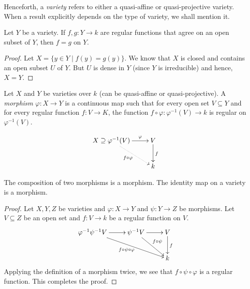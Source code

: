 Henceforth, a \emph{variety} refers to either a quasi-affine or quasi-projective variety. When a result explicitly depends on the type of variety, we shall mention it.

\begin{corollary}
    Let $Y$ be a variety. If $f,g: Y\to k$ are regular functions that agree on an open subset of $Y$, then $f = g$ on $Y$.
\end{corollary}
\begin{proof}
    Let $X = \{y\in Y\mid f(y) = g(y)\}$. We know that $X$ is closed and contains an open subset $U$ of $Y$. But $U$ is dense in $Y$ (since $Y$ is irreducible) and hence, $X = Y$.
\end{proof}

\begin{definition}[Morphism]
    Let $X$ and $Y$ be varieties over $k$ (can be quasi-affine or quasi-projective). A \emph{morphism} $\varphi: X\to Y$ is a continuous map such that for every open set $V\subseteq Y$ and for every regular function $f: V\to K$, the function $f\circ\varphi:\varphi^{-1}(V)\to k$ is regular on $\varphi^{-1}(V)$.

    \begin{equation*}
        \xymatrix {
            X\supseteq\varphi^{-1}(V)\ar[r]^-{\varphi}\ar@{.>}[rd]_{f\circ\varphi} & V\ar[d]^{f}\\
            & k
        }
    \end{equation*}
\end{definition}

\begin{proposition}
    The composition of two morphisms is a morphism. The identity map on a variety is a morphism.
\end{proposition}
\begin{proof}
    Let $X, Y, Z$ be varieties and $\varphi: X\to Y$ and $\psi: Y\to Z$ be morphisms. Let $V\subseteq Z$ be an open set and $f: V\to k$ be a regular function on $V$.
    \begin{equation*}
        \xymatrix {
            \varphi^{-1}\psi^{-1}V\ar[r]\ar[rrd]_{f\circ\psi\circ\varphi} & \psi^{-1}V\ar[r]\ar[rd]^{f\circ\psi} & V\ar[d]^f\\
            & & k
        }
    \end{equation*}
    Applying the definition of a morphism twice, we see that $f\circ\psi\circ\varphi$ is a regular function. This completes the proof.
\end{proof}

